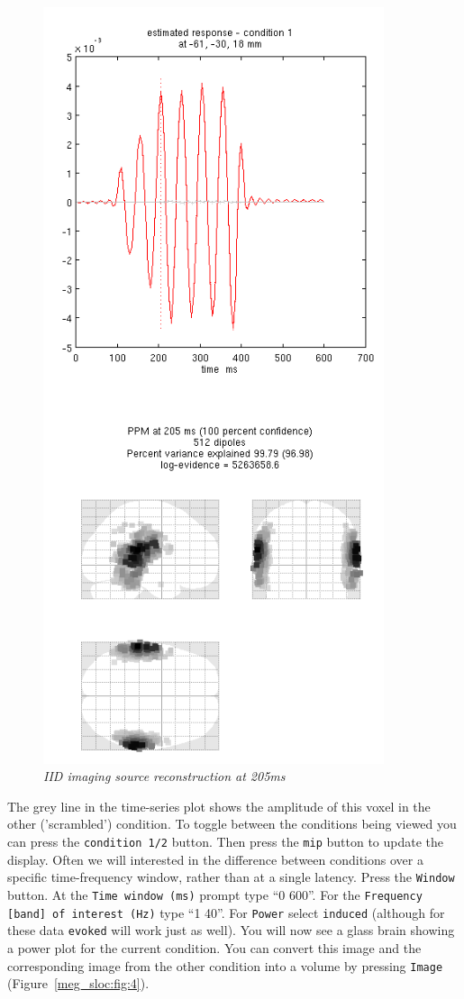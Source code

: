\begin{figure}
\begin{center}
\includegraphics[width=100mm]{meg_sloc/slide3}
\caption{\em IID imaging source reconstruction at 205ms \label{meg_sloc:fig:3}}
\end{center}
\end{figure}

The grey line in the time-series plot shows the amplitude of this voxel in the other ('scrambled') condition. To toggle between the conditions being viewed you can press the \texttt{condition 1/2} button. Then press the \texttt{mip} button to update the display.
Often we will interested in the difference between conditions over a specific time-frequency window, rather than at a single latency. Press the \texttt{Window} button. At the \texttt{Time window (ms)} prompt type ``0 600''. For the \texttt{Frequency [band] of interest (Hz)} type ``1 40''. For \texttt{Power} select \texttt{induced} (although for these data \texttt{evoked} will work just as well). You will now see a glass brain showing a power plot for the current condition. You can convert this image and the corresponding image from the other condition into a volume by pressing \texttt{Image} (Figure~\ref{meg_sloc:fig:4}).

